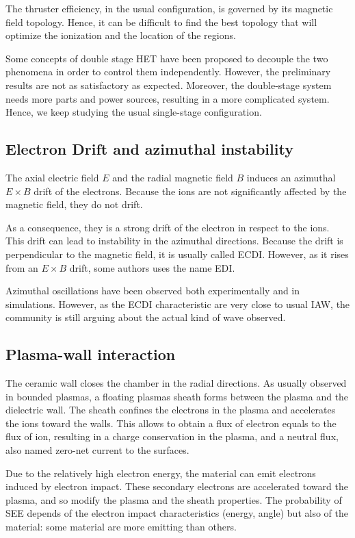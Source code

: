 The thruster efficiency, in the usual configuration, is governed by its magnetic field topology.
Hence, it can be difficult to find the best topology that will optimize the ionization and the location of the regions.

Some concepts of double stage \ac{HET} have been proposed to decouple the two phenomena in order to control them independently.
However, the preliminary results are not as satisfactory as expected.
Moreover, the double-stage system needs more parts and power sources, resulting in a more complicated system.
Hence, we keep studying the usual single-stage configuration.

\subsection{Electron Drift and azimuthal instability}
The axial electric field $E$ and the radial magnetic field $B$ induces an azimuthal $E\times B$ drift of the electrons.
Because the ions are not significantly affected by the magnetic field, they do not drift.

As a consequence, they is a strong drift of the electron in respect  to the ions.
This drift can lead to instability in the azimuthal directions.
Because the drift is perpendicular to the magnetic field, it is usually called \ac{ECDI}.
However, as it rises from an $E\times B$ drift, some authors uses the name \ac{EDI}.

Azimuthal oscillations have been observed both experimentally and in simulations.
However, as the \ac{ECDI} characteristic are very close to usual \ac{IAW}, the community is still arguing about the actual kind of wave observed.


\subsection{Plasma-wall interaction}
The ceramic wall closes the chamber in the radial directions.
As usually observed in bounded plasmas, a floating plasmas sheath forms between the plasma and the dielectric wall.
The sheath confines the electrons in the plasma and accelerates the ions toward the walls.
This allows to obtain a flux of electron equals to the flux of ion, resulting in a charge conservation in the plasma, and a neutral flux, also named zero-net current to the surfaces.

Due to the relatively high electron energy, the material can emit electrons induced by electron impact.
These secondary electrons are accelerated toward the plasma, and so modify the plasma and the sheath properties.
The probability of \ac{SEE} depends of the electron impact characteristics (energy, angle) but also of the material: some material are more emitting than others.


